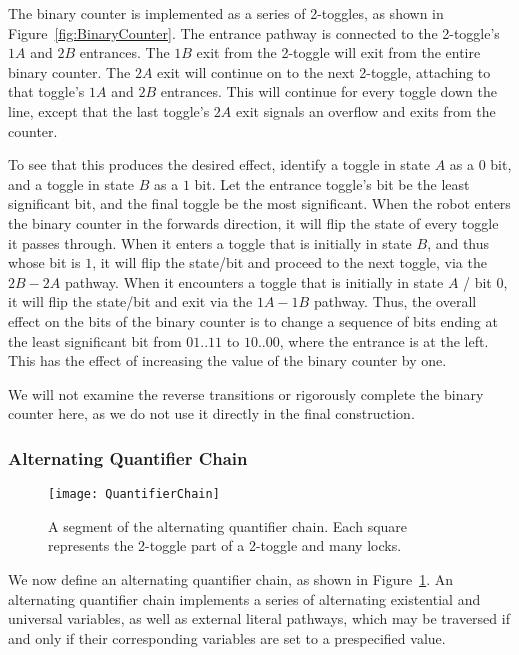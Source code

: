 The binary counter is implemented as a series of 2-toggles, as shown in Figure~\ref{fig:BinaryCounter}.
The entrance pathway is connected to the 2-toggle's $1A$ and $2B$ entrances. The $1B$ exit from the 2-toggle
will exit from the entire binary counter. The $2A$ exit will continue on to the next 2-toggle,
attaching to that toggle's $1A$ and $2B$ entrances. This will continue for every toggle down the line, except
that the last toggle's $2A$ exit signals an overflow and exits from the counter.

To see that this produces the desired effect, identify a toggle in state $A$ as a $0$ bit, and a toggle in state
$B$ as a $1$ bit. Let the entrance toggle's bit be the least significant bit, and the final toggle be the
most significant. When the robot enters the binary counter in the forwards direction, it will flip
the state of every toggle it passes through. When it enters a toggle that is initially in state $B$, and thus whose
bit is $1$, it will flip the state/bit and proceed to the next toggle, via the $2B - 2A$ pathway. When it
encounters a toggle that is initially in state $A$ / bit $0$, it will flip the state/bit and exit via the $1A - 1B$
pathway. Thus, the overall effect on the bits of the binary counter is to change a sequence of bits ending at the
least significant bit from $01..11$ to $10..00$, where the entrance is at the left.
This has the effect of increasing the value of the binary counter by one.

We will not examine the reverse transitions or rigorously complete the binary counter here, 
as we do not use it directly in the final construction. 

\subsubsection{Alternating Quantifier Chain}
\begin{figure}[h!]
\centering
    \texttt{[image: QuantifierChain]}
    \caption{A segment of the alternating quantifier chain. Each square represents the 2-toggle part of a 2-toggle and many locks.}
    \label{fig:QuantifierChain}
\end{figure}

We now define an alternating quantifier chain, as shown in Figure~\ref{fig:QuantifierChain}. An alternating quantifier chain implements a series of
alternating existential and universal variables, as well as external literal pathways, which may be traversed
if and only if their corresponding variables are set to a prespecified value.

